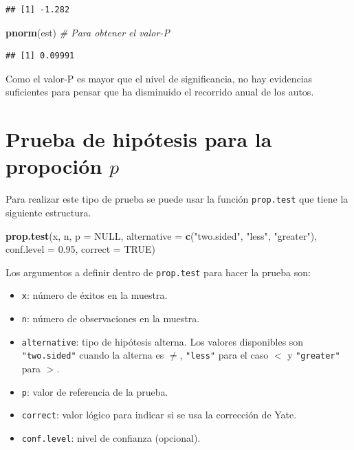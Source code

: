 \documentclass[10pt,]{krantz}
\makeatletter
\newenvironment{Shaded}{\begin{snugshade}}{\end{snugshade}}
\newcommand{\KeywordTok}[1]{\textcolor[rgb]{0.13,0.29,0.53}{\textbf{{#1}}}}
\newcommand{\DataTypeTok}[1]{\textcolor[rgb]{0.13,0.29,0.53}{{#1}}}
\newcommand{\FloatTok}[1]{\textcolor[rgb]{0.00,0.00,0.81}{{#1}}}
\newcommand{\StringTok}[1]{\textcolor[rgb]{0.31,0.60,0.02}{{#1}}}
\newcommand{\CommentTok}[1]{\textcolor[rgb]{0.56,0.35,0.01}{\textit{{#1}}}}
\newcommand{\OtherTok}[1]{\textcolor[rgb]{0.56,0.35,0.01}{{#1}}}
\newcommand{\NormalTok}[1]{{#1}}
\providecommand{\tightlist}{%
  \setlength{\itemsep}{0pt}\setlength{\parskip}{0pt}}
\newenvironment{kframe}{%
\medskip{}
\setlength{\fboxsep}{.8em}
 \def\at@end@of@kframe{}%
 \ifinner\ifhmode%
  \def\at@end@of@kframe{\end{minipage}}%
  \begin{minipage}{\columnwidth}%
 \fi\fi%
 \def\FrameCommand##1{\hskip\@totalleftmargin \hskip-\fboxsep
 \colorbox{shadecolor}{##1}\hskip-\fboxsep
     \hskip-\linewidth \hskip-\@totalleftmargin \hskip\columnwidth}%
 \MakeFramed {\advance\hsize-\width
   \@totalleftmargin\z@ \linewidth\hsize
   \@setminipage}}%
 {\par\unskip\endMakeFramed%
 \at@end@of@kframe}
\renewenvironment{Shaded}{\begin{kframe}}{\end{kframe}}
\makeatother
\begin{document}
\begin{verbatim}
## [1] -1.282
\end{verbatim}

\begin{Shaded}
\begin{Highlighting}[]
\KeywordTok{pnorm}\NormalTok{(est)  }\CommentTok{# Para obtener el valor-P}
\end{Highlighting}
\end{Shaded}

\begin{verbatim}
## [1] 0.09991
\end{verbatim}

Como el valor-P es mayor que el nivel de significancia, no hay
evidencias suficientes para pensar que ha disminuido el recorrido anual
de los autos.

\section{\texorpdfstring{Prueba de hipótesis para la propoción
\(p\)}{Prueba de hipótesis para la propoción p}}\label{prueba-de-hipotesis-para-la-propocion-p}

Para realizar este tipo de prueba se puede usar la función
\texttt{prop.test} que tiene la siguiente estructura.

\begin{Shaded}
\begin{Highlighting}[]
\KeywordTok{prop.test}\NormalTok{(x, n, }\DataTypeTok{p =} \OtherTok{NULL}\NormalTok{,}
          \DataTypeTok{alternative =} \KeywordTok{c}\NormalTok{(}\StringTok{"two.sided"}\NormalTok{, }\StringTok{"less"}\NormalTok{, }\StringTok{"greater"}\NormalTok{),}
          \DataTypeTok{conf.level =} \FloatTok{0.95}\NormalTok{, }\DataTypeTok{correct =} \OtherTok{TRUE}\NormalTok{)}
\end{Highlighting}
\end{Shaded}

Los argumentos a definir dentro de \texttt{prop.test} para hacer la
prueba son:

\begin{itemize}
\tightlist
\item
  \texttt{x}: número de éxitos en la muestra.
\item
  \texttt{n}: número de observaciones en la muestra.
\item
  \texttt{alternative}: tipo de hipótesis alterna. Los valores
  disponibles son \texttt{"two.sided"} cuando la alterna es \(\neq\),
  \texttt{"less"} para el caso \(<\) y \texttt{"greater"} para \(>\).
\item
  \texttt{p}: valor de referencia de la prueba.
\item
  \texttt{correct}: valor lógico para indicar si se usa la corrección de
  Yate.
\item
  \texttt{conf.level}: nivel de confianza (opcional).
\end{itemize}
\end{document}
